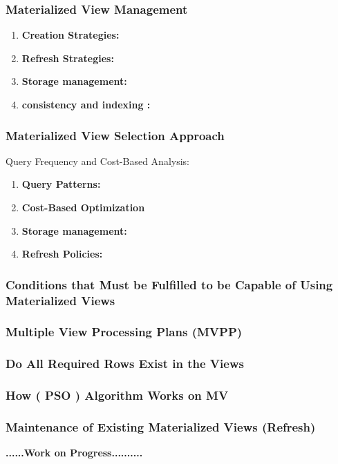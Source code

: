 \subsubsection{Materialized View Management }

\begin{enumerate}[label=\alph*)]
    \item \textbf{Creation Strategies:}
    \item \textbf{Refresh Strategies:}
    \item \textbf{Storage management:}
    \item \textbf{consistency and  indexing :}
\end{enumerate}

\subsubsection{Materialized View Selection Approach}

  Query Frequency and Cost-Based Analysis:
  
\begin{enumerate}[label=\alph*)]
    \item \textbf{Query Patterns:}
    \item \textbf{Cost-Based Optimization}
    \item \textbf{Storage management:}
    \item \textbf{ Refresh Policies:}
\end{enumerate}

\subsubsection{Conditions that Must be Fulfilled to be Capable of Using Materialized Views }







\subsubsection{Multiple View Processing Plans (MVPP) }
\subsubsection{Do All Required Rows Exist in the Views }
\subsubsection{How ( PSO ) Algorithm Works on MV}
\subsubsection{Maintenance of Existing Materialized Views (Refresh)}


\textbf{......\textbf{Work on Progress}..........}       
 
